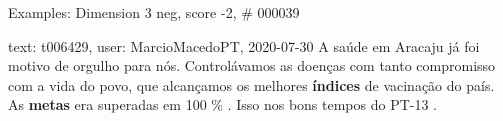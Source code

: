 \begin{frame}{Examples: Dimension 3 neg, score -2, \# 000039}
\footnotesize
\begin{alertblock}{text: t006429, user: MarcioMacedoPT, 2020-07-30}
A saúde em Aracaju já foi motivo de orgulho para nós. Controlávamos as doenças 
com tanto compromisso com a vida do povo, que alcançamos os melhores 
\textbf{índices} de vacinação do país. As \textbf{metas} era superadas em 100 
\% . Isso nos bons tempos do PT-13 . 
\end{alertblock}
\end{frame}
